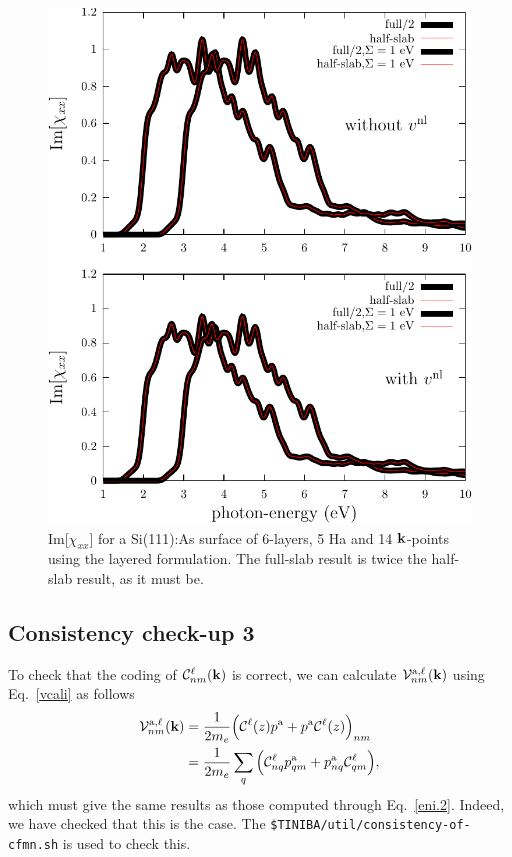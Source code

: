 \begin{figure}[b]
\centering
\includegraphics[scale=.7]{plots/surface-chi}
\caption{Im[$\chi_{xx}$] 
for a Si(111):As surface of 6-layers, 5 Ha and 14 $\mathbf{k}$-points using
the layered formulation. 
The full-slab result is twice the half-slab
result, as it must be.
}
\label{si111as}
\end{figure}

\subsection{Consistency check-up 3}

To check that the coding of 
${\mathbf{\cal C}}^\ell_{nm}(\mathbf{k})$ 
is correct, we can calculate ${\mathbf{\cal V}}^{\mathrm{a},\ell}_{nm}(\mathbf{k})$ using
Eq.~\eqref{vcali} as follows
\begin{align}\label{ccu.1}
{\mathbf{\cal V}}^{\mathrm{a},\ell}_{nm}(\mathbf{k})
&=
\frac{1}{2m_e}
\Big(
{\mathbf{\cal C}}^\ell(z)p^{\mathrm{a}}
+
p^{\mathrm{a}}{\mathbf{\cal C}}^\ell(z)
\Big)_{nm}
\nonumber\\
&=
\frac{1}{2m_e}
\sum_q
\Big(
{\mathbf{\cal C}}^\ell_{nq}p^{\mathrm{a}}_{qm}
+
p^{\mathrm{a}}_{nq}{\mathbf{\cal C}}^\ell_{qm}
\Big)
,
\end{align}
which must give the same results as those computed through
Eq.~\eqref{eni.2}.
Indeed, we have checked that this is the case. The
\verb=$TINIBA/util/consistency-of-cfmn.sh=
is used to check this.

